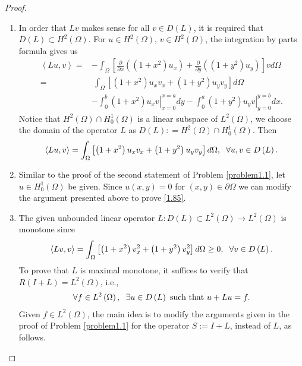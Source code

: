 \documentclass[11pt,a4paper]{article}
\numberwithin{equation}{section}
\numberwithin{equation}{section}
\begin{document}
\begin{proof}
\begin{enumerate}
\item In order that $Lv$ makes sense for all $v\in D\left(L\right)$, it is required that $D\left( L \right) \subset {H^2}\left( \Omega  \right)$. For $u\in H^2 \left(\Omega\right)$, $v\in {H^2}\left( \Omega  \right)$, the integration by parts formula gives us
\begin{align}
\left\langle {Lu,v} \right\rangle  = & - \int_\Omega  {\left[ {\frac{\partial }{{\partial x}}\left( {\left( {1 + {x^2}} \right){u_x}} \right) + \frac{\partial }{{\partial y}}\left( {\left( {1 + {y^2}} \right){u_y}} \right)} \right]vd\Omega } \\
 =&\ \int_\Omega  {\left[ {\left( {1 + {x^2}} \right){u_x}{v_x} + \left( {1 + {y^2}} \right){u_y}{v_y}} \right]d\Omega } \\
 &- \int_0^b {\left. {\left( {1 + {x^2}} \right){u_x}v} \right|_{x = 0}^{x = a}dy}  - \int_0^a {\left. {\left( {1 + {y^2}} \right){u_y}v} \right|_{y = 0}^{y = b}dx} .
\end{align}
Notice that ${H^2}\left( \Omega  \right) \cap H_0^1\left( \Omega  \right)$ is a linear subspace of $L^2\left(\Omega\right)$, we choose the domain of the operator $L$ as $D\left( L \right): = {H^2}\left( \Omega  \right) \cap H_0^1\left( \Omega  \right)$. Then 
\begin{align}
\left\langle {Lu,v} \right\rangle  = \int_\Omega  {\left[ {\left( {1 + {x^2}} \right){u_x}{v_x} + \left( {1 + {y^2}} \right){u_y}{v_y}} \right]d\Omega } ,\hspace{0.2cm} \forall u,v \in D\left( L \right).
\end{align}
\item Similar to the proof of the second statement of Problem \ref{problem1.1}, let $u\in H_0^1\left(\Omega\right)$ be given. Since $u \left(x,y\right) =0$ for $\left(x,y\right) \in \partial \Omega$ we can modify the argument presented above to prove \eqref{1.85}.
\item The given unbounded linear operator $L: D\left(L\right) \subset L^2\left(\Omega\right) \to L^2\left(\Omega\right)$ is monotone since
\begin{align}
\left\langle {Lv,v} \right\rangle  = \int_\Omega  {\left[ {\left( {1 + {x^2}} \right)v_x^2 + \left( {1 + {y^2}} \right)v_y^2} \right]d\Omega }  \ge 0,\hspace{0.2cm}\forall v \in D\left( L \right) .
\end{align}
To prove that $L$ is maximal monotone, it suffices to verify that $R\left(I+L\right)= L^2\left(\Omega\right)$, i.e., 
\begin{align}
\label{1.92}
\forall f \in {L^2}\left( \Omega  \right),\hspace{0.2cm}\exists u \in D\left( L \right)\mbox{ such that } u + Lu = f.
\end{align}
Given $f\in L^2\left(\Omega\right)$, the main idea is to modify the arguments given in the proof of Problem \ref{problem1.1} for the operator $S:=I+L$, instead of $L$, as follows.


\end{enumerate}
\end{proof}
\end{document}
